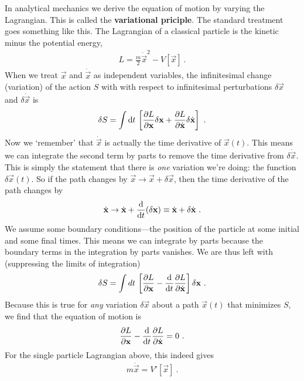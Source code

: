In analytical mechanics we derive the equation of motion by varying the Lagrangian. This is called the \textbf{variational priciple}. The standard treatment goes something like this. The Lagrangian of a classical particle is the kinetic minus the potential energy,
\begin{align}
    L = \frac{m}{2} \dot{\vec{x}}^2 - V[\vec{x}] \ .
\end{align}
When we treat $\vec{x}$ and $\dot{\vec{x}}$ as independent variables, the infinitesimal change (variation) of the action $S$ with with respect to infinitesimal perturbations $\delta\vec{x}$ and $\delta\dot{\vec{x}}$ is
\begin{align}
    \delta S =
    \int \operatorname{d}\mkern-3mu^{}\mkern-1mu{t} \,
    \left[
    \frac{\partial L}{\partial \mathbf{x}} \delta\mathbf{x}
    +
    \frac{\partial L}{\partial \dot{\mathbf{x}}}\delta\dot{\mathbf{x}}
    \right] \ .
\end{align}
Now we `remember' that $\dot{\vec{x}}$ is actually the time derivative of $\vec{x}(t)$. This means we can integrate the second term by parts to remove the time derivative from $\delta\dot{\vec{x}}$. This is simply the statement that there is \emph{one} variation we're doing: the function $\delta\vec{x}(t)$. So if the path changes by $\vec{x}\to\vec{x}+\delta\vec{x}$, then the time derivative of the path changes by
\begin{align}
    \dot{\mathbf{x}} 
    \to \dot{\mathbf{x}} 
    + \frac{\operatorname{d}\mkern-3mu^{}\mkern-1mu{}}{\operatorname{d}\mkern-3mu^{}\mkern-1mu{t}}(\delta\mathbf{x}) 
    \equiv \dot{\mathbf{x}} + \delta\dot{\mathbf{x}} \ . 
\end{align}
% 
% 
We assume some boundary conditions---the position of the particle at some initial and some final times. This means we can integrate by parts because the boundary terms in the integration by parts vanishes.  We are thus left with (suppressing the limits of integration)
\begin{align}
    \delta S = \int dt\, 
    \left[
    \frac{\partial L}{\partial \mathbf{x}}
    - 
    \frac{\operatorname{d}\mkern-3mu^{}\mkern-1mu{}}{\operatorname{d}\mkern-3mu^{}\mkern-1mu{t}}
    \frac{\partial L}{\partial \dot{\mathbf{x}}} 
    \right]\delta\mathbf{x} \ .
\end{align}
Because this is true for \emph{any} variation $\delta\vec{x}$ about a path $\vec{x}(t)$ that minimizes $S$, we find that the equation of motion is 
\begin{align}
    \frac{\partial L}{\partial \mathbf{x}}
    - 
    \frac{\operatorname{d}\mkern-3mu^{}\mkern-1mu{}}{\operatorname{d}\mkern-3mu^{}\mkern-1mu{t}}
    \frac{\partial L}{\partial \dot{\mathbf{x}}}  = 0 \ .
\end{align}
For the single particle Lagrangian above, this indeed gives
\begin{align}
    m\ddot{\vec{x}} = V'[\vec{x}] \ .
\end{align}


